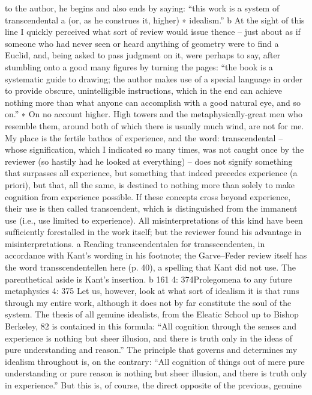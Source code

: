 to the author, he begins and also ends by saying: “this work is a system
of transcendental a (or, as he construes it, higher) ∗ idealism.” b
At the sight of this line I quickly perceived what sort of review would
issue thence – just about as if someone who had never seen or heard
anything of geometry were to ﬁnd a Euclid, and, being asked to pass
judgment on it, were perhaps to say, after stumbling onto a good many
ﬁgures by turning the pages: “the book is a systematic guide to drawing;
the author makes use of a special language in order to provide obscure,
unintelligible instructions, which in the end can achieve nothing more
than what anyone can accomplish with a good natural eye, and so on.”
∗ On no account higher. High towers and the metaphysically-great men who
resemble them, around both of which there is usually much wind, are not for
me. My place is the fertile bathos of experience, and the word: transcendental –
whose signiﬁcation, which I indicated so many times, was not caught once by the
reviewer (so hastily had he looked at everything) – does not signify something
that surpasses all experience, but something that indeed precedes experience (a
priori), but that, all the same, is destined to nothing more than solely to make
cognition from experience possible. If these concepts cross beyond experience,
their use is then called transcendent, which is distinguished from the immanent
use (i.e., use limited to experience). All misinterpretations of this kind have been
sufﬁciently forestalled in the work itself; but the reviewer found his advantage
in misinterpretations.
a Reading transcendentalen for transscendenten, in accordance with Kant’s wording in his
footnote; the Garve–Feder review itself has the word transscendentellen here (p. 40), a
spelling that Kant did not use.
The parenthetical aside is Kant’s insertion.
b
161
4: 374Prolegomena to any future metaphysics
4: 375
Let us, however, look at what sort of idealism it is that runs through
my entire work, although it does not by far constitute the soul of the
system.
The thesis of all genuine idealists, from the Eleatic School up to
Bishop Berkeley, 82 is contained in this formula: “All cognition through
the senses and experience is nothing but sheer illusion, and there is truth
only in the ideas of pure understanding and reason.”
The principle that governs and determines my idealism throughout is,
on the contrary: “All cognition of things out of mere pure understanding
or pure reason is nothing but sheer illusion, and there is truth only in
experience.”
But this is, of course, the direct opposite of the previous, genuine
